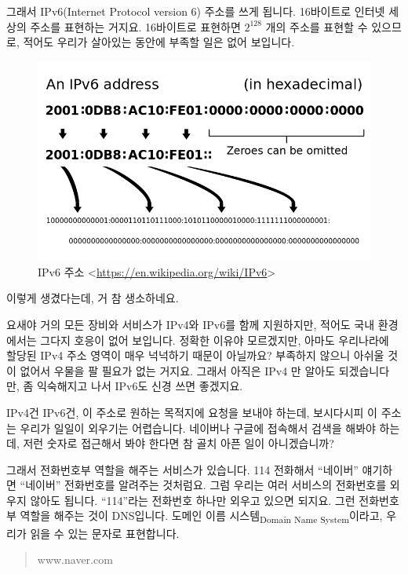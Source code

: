\documentclass[11pt,a4paper]{article}
\newcommand{\sub}[1]{\textsubscript{#1}}
\begin{document}
그래서 IPv6(Internet Protocol version 6) 주소를 쓰게 됩니다. 16바이트로 인터넷 세상의 주소를 표현하는 거지요. 16바이트로 표현하면 $2^{128}$ 개의 주소를 표현할 수 있으므로, 적어도 우리가 살아있는 동안에 부족할 일은 없어 보입니다.

\begin{figure}[H]
\centering
\includegraphics[width=\textwidth]{ipv6_address.png}
\caption{IPv6 주소 <\url{https://en.wikipedia.org/wiki/IPv6}>}
\end{figure}

이렇게 생겼다는데, 거 참 생소하네요.

요새야 거의 모든 장비와 서비스가 IPv4와 IPv6를 함께 지원하지만, 적어도 국내 환경에서는 그다지 호응이 없어 보입니다. 정확한 이유야 모르겠지만, 아마도 우리나라에 할당된 IPv4 주소 영역이 매우 넉넉하기 때문이 아닐까요? 부족하지 않으니 아쉬울 것이 없어서 우물을 팔 필요가 없는 거지요. 그래서 아직은 IPv4 만 알아도 되겠습니다만, 좀 익숙해지고 나서 IPv6도 신경 쓰면 좋겠지요.

IPv4건 IPv6건, 이 주소로 원하는 목적지에 요청을 보내야 하는데, 보시다시피 이 주소는 우리가 일일이 외우기는 어렵습니다. 네이버나 구글에 접속해서 검색을 해봐야 하는데, 저런 숫자로 접근해서 봐야 한다면 참 골치 아픈 일이 아니겠습니까?

그래서 전화번호부 역할을 해주는 서비스가 있습니다. 114 전화해서 ``네이버'' 얘기하면 ``네이버'' 전화번호를 알려주는 것처럼요. 그럼 우리는 여러 서비스의 전화번호를 외우지 않아도 됩니다. ``114''라는 전화번호 하나만 외우고 있으면 되지요. 그런 전화번호부 역할을 해주는 것이 DNS입니다. 도메인 이름 시스템\sub{Domain Name System}이라고, 우리가 읽을 수 있는 문자로 표현합니다.

\begin{quote}
www.naver.com
\end{quote}
\end{document}
